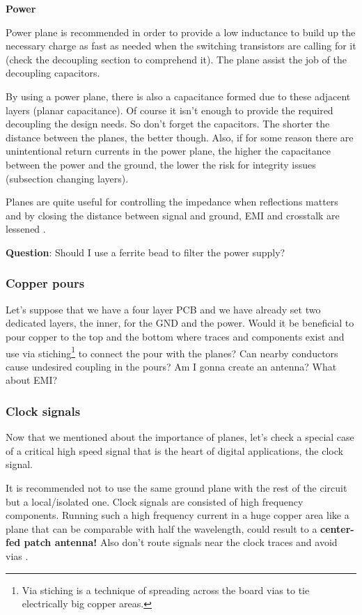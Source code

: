\documentclass[final]{cubedoc}
\begin{document}
	\textbf{Power}
	
	Power plane is recommended in order to provide a low inductance to build up the necessary charge as fast as needed when the switching transistors are calling for it (check the decoupling section to comprehend it). The plane assist the job of the decoupling capacitors.
	
	
	By using a power plane, there is also a capacitance formed due to these adjacent layers (planar capacitance). Of course it isn't enough to provide the required decoupling the design needs. So don't forget the capacitors. The shorter the distance between the planes, the better though. Also, if for some reason there are unintentional return currents in the power plane, the higher the capacitance between the power and the ground, the lower the risk for integrity issues (subsection changing layers).
	
	Planes are quite useful for controlling the impedance when reflections matters and by closing the distance between signal and ground, EMI and crosstalk are lessened \cite{brooks2003signal, bogatin2009signal}.
	
	\textbf{Question}: Should I use a ferrite bead to filter the power supply?
	
	\subsubsection{Copper pours}
	
	Let's suppose that we have a four layer PCB and we have already set two dedicated layers, the inner, for the GND and the power. Would it be beneficial to pour copper to the top and the bottom where traces and components exist and use via stiching\footnote{Via stiching is a technique of spreading across the board vias to tie electrically big copper areas.} to connect the pour with the planes? Can nearby conductors cause undesired coupling in the pours? Am I gonna create an antenna? What about EMI?
	
	\subsubsection{Clock signals}
	
	Now that we mentioned about the importance of planes, let's check a special case of a critical high speed signal that is the heart of digital applications, the clock signal.
	
	It is recommended not to use the same ground plane with the rest of the circuit but a local/isolated one. Clock signals are consisted of high frequency components. Running such a high frequency current in a huge copper area like a plane that can be comparable with half the wavelength, could result to a \textbf{center-fed patch antenna!} Also don't route signals near the clock traces and avoid vias \cite{stackexchange:decoupling, stackexchange:crystal, atmel:clock}.
	
\end{document}
